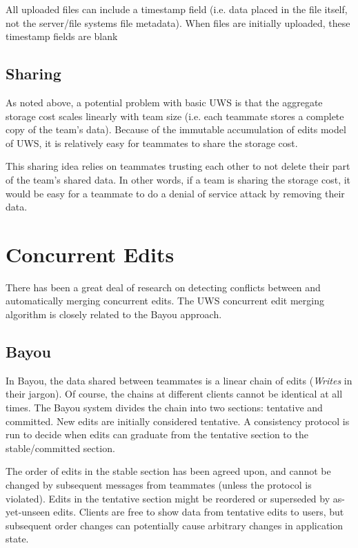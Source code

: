 \documentclass{article}
\begin{document}
All uploaded files can include a timestamp field (i.e. data placed in the file itself, not the server/file systems file metadata).
When files are initially uploaded, these timestamp fields are blank



\subsection{Sharing}

As noted above, a potential problem with basic UWS is that the aggregate storage cost scales linearly with team size (i.e. each teammate stores a complete copy of the team's data).
Because of the immutable accumulation of edits model of UWS, it is relatively easy for teammates to share the storage cost.

This sharing idea relies on teammates trusting each other to not delete their part of the team's shared data.
In other words, if a team is sharing the storage cost, it would be easy for a teammate to do a denial of service attack by removing their data.

\section{Concurrent Edits}

There has been a great deal of research on detecting conflicts between and automatically merging concurrent edits.
The UWS concurrent edit merging algorithm is closely related to the Bayou approach.

\subsection{Bayou}

In Bayou, the data shared between teammates is a linear chain of edits (\emph{Writes} in their jargon).
Of course, the chains at different clients cannot be identical at all times.
The Bayou system divides the chain into two sections: tentative and committed.
New edits are initially considered tentative.
A consistency protocol is run to decide when edits can graduate from the tentative section to the stable/committed section.

The order of edits in the stable section has been agreed upon, and cannot be changed by subsequent messages from teammates (unless the protocol is violated).
Edits in the tentative section might be reordered or superseded by as-yet-unseen edits.
Clients are free to show data from tentative edits to users, but subsequent order changes can potentially cause arbitrary changes in application state.
\end{document}

